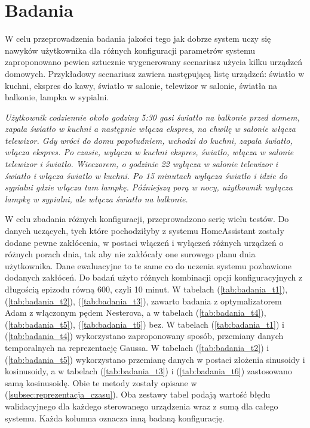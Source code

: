 \chapter{Badania}

W celu przeprowadzenia badania jakości tego jak dobrze system uczy się nawyków użytkownika dla różnych konfiguracji parametrów systemu zaproponowano pewien sztucznie wygenerowany scenariusz użycia kilku urządzeń domowych. Przykładowy scenariusz zawiera następującą listę urządzeń: światło w kuchni, ekspres do kawy, światło w salonie, telewizor w salonie, światła na balkonie, lampka w sypialni.

\textit{Użytkownik codziennie około godziny 5:30 gasi światło na balkonie przed domem, zapala światło w kuchni a następnie włącza ekspres, na chwilę w salonie włącza telewizor. Gdy wróci do domu popołudniem, wchodzi do kuchni, zapala światło, włącza ekspres. Po czasie, wyłącza w kuchni ekspres, światło, włącza w salonie telewizor i światło. Wieczorem, o godzinie 22 wyłącza w salonie telewizor i światło i włącza światło w kuchni.
Po 15 minutach wyłącza światło i idzie do sypialni gdzie włącza tam lampkę. Późniejszą porą w nocy, użytkownik wyłącza lampkę w sypialni, ale włącza światło na balkonie.}

W celu zbadania różnych konfiguracji, przeprowadzono serię wielu testów. Do danych uczących, tych które pochodziłyby z systemu HomeAssistant zostały dodane pewne zakłócenia, w postaci włączeń i wyłączeń różnych urządzeń o różnych porach dnia, tak aby nie zakłócały one surowego planu dnia użytkownika. Dane ewaluacyjne to te same co do uczenia systemu pozbawione dodanych zakłóceń. Do badań użyto różnych kombinacji opcji konfiguracyjnych z długością epizodu równą 600, czyli 10 minut. W tabelach (\ref{tab:badania_t1}), (\ref{tab:badania_t2}), (\ref{tab:badania_t3}), zawarto badania z optymalizatorem Adam z włączonym pędem Nesterova, a w tabelach (\ref{tab:badania_t4}), (\ref{tab:badania_t5}), (\ref{tab:badania_t6}) bez. W tabelach (\ref{tab:badania_t1}) i (\ref{tab:badania_t4}) wykorzystano zaproponowany sposób, przemiany danych temporalnych na reprezentację Gaussa. W tabelach (\ref{tab:badania_t2}) i (\ref{tab:badania_t5}) wykorzystano przemianę danych w postaci złożenia sinusoidy i kosinusoidy, a w tabelach (\ref{tab:badania_t3}) i (\ref{tab:badania_t6}) zastosowano samą kosinusoidę. Obie te metody zostały opisane w (\ref{subsec:reprezentacja_czasu}). Oba zestawy tabel podają wartość błędu walidacyjnego dla każdego sterowanego urządzenia wraz z sumą dla całego systemu. Każda kolumna oznacza inną badaną konfigurację.

